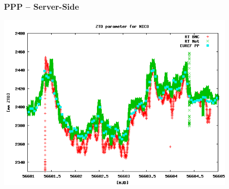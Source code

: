 \documentclass[10pt]{beamer}
\begin{document}
\begin{frame}
\frametitle{PPP -- Server-Side}
  \begin{center}
    \includegraphics[width=0.9\textwidth,angle=0]{tropo3.png}
  \end{center}
\end{frame}

\end{document}
